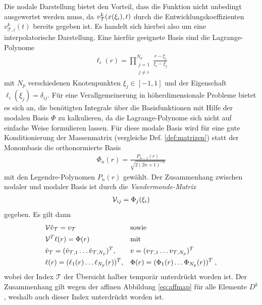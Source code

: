 Die nodale Darstellung bietet den Vorteil, dass die Funktion nicht unbedingt ausgewertet werden muss, da $v_{\mathcal{T}}^k(x(\xi_i),t)$ durch die Entwicklungskoeffizienten $v_{\mathcal{T},i}^k(t)$ bereits gegeben ist. Es handelt sich hierbei also um eine interpolatorische Darstellung.
Eine hierfür geeignete Basis sind die Lagrange-Polynome
\begin{align}
  \ell_i(r) = \prod_{\substack{j=1 \\ j\neq i}}^{N_p} \frac{r-\xi_j}{\xi_i-\xi_j}
  \label{eq:nodalebasis}
\end{align}
mit $N_p$ verschiedenen Knotenpunkten $\xi_j\in[-1,1]$ und der Eigenschaft ${\ell_i(\xi_j)=\delta_{ij}}$. Für eine Verallgemeinerung in höherdimensionale Probleme bietet es sich an, die benötigten Integrale über die Basisfunktionen mit Hilfe der modalen Basis $\Phi$ zu kalkulieren, da die Lagrange-Polynome sich nicht auf einfache Weise formulieren lassen. Für diese modale Basis wird für eine gute Konditionierung der Massenmatrix (vergleiche Def. \ref{def:matrizen}) statt der Monombasis die orthonormierte Basis
\begin{align}
  \Phi_n(r) = \frac{P_{n-1}(r)}{\sqrt{2(2n+1)^{-1}}}
  \label{eq:modaleBasis}
\end{align}
mit den Legendre-Polynomen $P_n(r)$ gewählt. Der Zusammenhang zwischen nodaler und modaler Basis ist durch die \emph{Vandermonde-Matrix}
\begin{equation}
  \begin{aligned}
    \mathcal{V}_{ij} = \Phi_j(\xi_i)
  \end{aligned}
  \label{eq:vandermonde}
\end{equation}
gegeben. Es gilt dann
  \begin{align}
    &\mathcal{V}\hat{v}_{\mathcal{T}} = v_{\mathcal{T}}        & &\text{sowie} \label{eq:nodalmodal}\\
    &\mathcal{V}^T\ell(r) = \Phi(r) & &\text{mit} \label{eq:ellPsi}\\
    &\hat{v}_{\mathcal{T}} = (\hat{v}_{\mathcal{T},1} \dots \hat{v}_{\mathcal{T},N_p})^T, & & v =(v_{\mathcal{T},1} \dots v_{\mathcal{T},N_p})^T \nonumber \\
    &\ell(r) = (\ell_1(r) \dots \ell_{N_p}(r))^T, & & \Phi(r) =(\Phi_1(r) \dots \Phi_{N_p}(r))^T \nonumber \; ,
  \end{align}
wobei der Index $\mathcal{T}$ der Übersicht halber temporär unterdrückt worden ist. Der Zusammenhang gilt wegen der affinen Abbildung \eqref{eq:affmap} für alle Elemente $D^k$, weshalb auch dieser Index unterdrückt worden ist.

